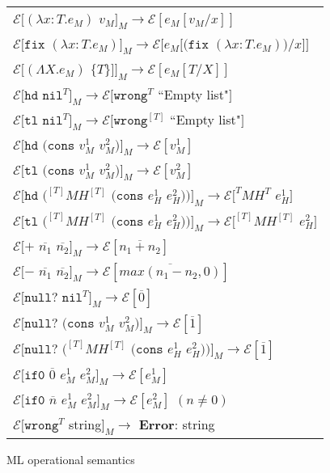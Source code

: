 \begin{figure}[p]
\centering
\begin{tabular}{l}
$\mathscr{E}[(\lambda x:T.e_{M})$ $v_{M}]_{M}\rightarrow\mathscr{E}[e_{M}[v_{M}/x]]$ \\
$\mathscr{E}[\mathtt{fix}$ $(\lambda x:T.e_{M})]_{M}\rightarrow\mathscr{E}[e_{M}[(\mathtt{fix}$ $(\lambda x:T.e_{M}))/x]]$ \\
$\mathscr{E}[(\Lambda X.e_{M})$ $\lbrace T\rbrace]]_{M}\rightarrow\mathscr{E}[e_{M}[T/X]]$ \\
$\mathscr{E}[\mathtt{hd}$ $\mathtt{nil}^{T}]_{M}\rightarrow\mathscr{E}[\mathtt{wrong}^{T}$ ``Empty list"$]$ \\
$\mathscr{E}[\mathtt{tl}$ $\mathtt{nil}^{T}]_{M}\rightarrow\mathscr{E}[\mathtt{wrong}^{[T]}$ ``Empty list"$]$ \\
$\mathscr{E}[\mathtt{hd}$ $(\mathtt{cons}$ $v_{M}^{1}$ $v_{M}^{2})]_{M}\rightarrow\mathscr{E}[v_{M}^{1}]$ \\
$\mathscr{E}[\mathtt{tl}$ $(\mathtt{cons}$ $v_{M}^{1}$ $v_{M}^{2})]_{M}\rightarrow\mathscr{E}[v_{M}^{2}]$ \\
$\mathscr{E}[\mathtt{hd}$ $(^{[T]}MH^{[T]}$ $(\mathtt{cons}$ $e_{H}^{1}$ $e_{H}^{2}))]_{M}\rightarrow\mathscr{E}[^{T}MH^{T}$ $e_{H}^{1}]$ \\
$\mathscr{E}[\mathtt{tl}$ $(^{[T]}MH^{[T]}$ $(\mathtt{cons}$ $e_{H}^{1}$ $e_{H}^{2}))]_{M}\rightarrow\mathscr{E}[^{[T]}MH^{[T]}$ $e_{H}^{2}]$ \\
$\mathscr{E}[+$ $\overline{n_{1}}$ $\overline{n_{2}}]_{M}\rightarrow\mathscr{E}[\overline{n_{1}+n_{2}}]$ \\
$\mathscr{E}[-$ $\overline{n_{1}}$ $\overline{n_{2}}]_{M}\rightarrow\mathscr{E}[\overline{max(n_{1}-n_{2},0)}]$ \\
$\mathscr{E}[\mathtt{null?}$ $\mathtt{nil}^{T}]_{M}\rightarrow\mathscr{E}[\overline{0}]$ \\
$\mathscr{E}[\mathtt{null?}$ $(\mathtt{cons}$ $v_{M}^{1}$ $v_{M}^{2})]_{M}\rightarrow\mathscr{E}[\overline{1}]$ \\
$\mathscr{E}[\mathtt{null?}$ $(^{[T]}MH^{[T]}$ $(\mathtt{cons}$ $e_{H}^{1}$ $e_{H}^{2}))]_{M}\rightarrow\mathscr{E}[\overline{1}]$ \\
$\mathscr{E}[\mathtt{if0}$ $\overline{0}$ $e_{M}^{1}$ $e_{M}^{2}]_{M}\rightarrow\mathscr{E}[e_{M}^{1}]$ \\
$\mathscr{E}[\mathtt{if0}$ $\overline{n}$ $e_{M}^{1}$ $e_{M}^{2}]_{M}\rightarrow\mathscr{E}[e_{M}^{2}]$ $(n\neq0)$ \\
$\mathscr{E}[\mathtt{wrong}^{T}$ string$]_{M}\rightarrow$ \textbf{Error}: string
\end{tabular}
\caption{ML operational semantics}
\label{mos}
\end{figure}